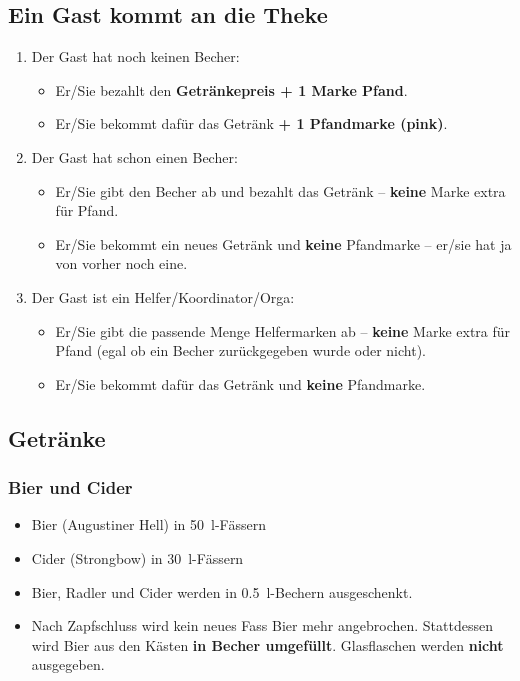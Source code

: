 \subsection{Ein Gast kommt an die Theke}
\begin{enumerate}
  \item Der Gast hat noch keinen Becher:
    \begin{itemize}
      \item Er/Sie bezahlt den \textbf{Getränkepreis + 1 Marke Pfand}.
      \item Er/Sie bekommt dafür das Getränk \textbf{+ 1 Pfandmarke (pink)}.
    \end{itemize}
  \item Der Gast hat schon einen Becher:
    \begin{itemize}
      \item Er/Sie gibt den Becher ab und bezahlt das Getränk -- \textbf{keine} Marke extra für Pfand.
      \item Er/Sie bekommt ein neues Getränk und \textbf{keine} Pfandmarke -- er/sie hat ja von vorher noch eine.
    \end{itemize}
  \item Der Gast ist ein Helfer/Koordinator/Orga:
    \begin{itemize}
      \item Er/Sie gibt die passende Menge Helfermarken ab -- \textbf{keine} Marke extra für Pfand (egal ob ein Becher zurückgegeben wurde oder nicht).
      \item Er/Sie bekommt dafür das Getränk und \textbf{keine} Pfandmarke.
    \end{itemize}
\end{enumerate}
\subsection{Getränke}
\subsubsection{Bier und Cider}
\begin{itemize}
  \item Bier (Augustiner Hell) in \SI{50}{\litre}-Fässern
  \item Cider (Strongbow) in \SI{30}{\litre}-Fässern
  \item Bier, Radler und Cider werden in \SI{0.5}{\litre}-Bechern ausgeschenkt.
  \item Nach Zapfschluss wird kein neues Fass Bier mehr angebrochen. Stattdessen wird Bier aus den Kästen \textbf{in Becher umgefüllt}. Glasflaschen werden \textbf{nicht} ausgegeben.
\end{itemize}
